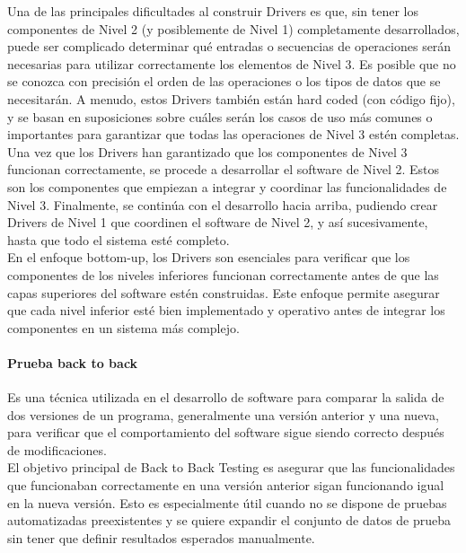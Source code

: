 Una de las principales dificultades al construir Drivers es que, sin tener los componentes de Nivel 2 (y posiblemente de Nivel 1) completamente desarrollados, puede ser complicado determinar qué entradas o secuencias de operaciones serán necesarias para utilizar correctamente los elementos de Nivel 3. Es posible que no se conozca con precisión el orden de las operaciones o los tipos de datos que se necesitarán. A menudo, estos Drivers también están hard coded (con código fijo), y se basan en suposiciones sobre cuáles serán los casos de uso más comunes o importantes para garantizar que todas las operaciones de Nivel 3 estén completas. \\

Una vez que los Drivers han garantizado que los componentes de Nivel 3 funcionan correctamente, se procede a desarrollar el software de Nivel 2. Estos son los componentes que empiezan a integrar y coordinar las funcionalidades de Nivel 3. Finalmente, se continúa con el desarrollo hacia arriba, pudiendo crear Drivers de Nivel 1 que coordinen el software de Nivel 2, y así sucesivamente, hasta que todo el sistema esté completo. \\

En el enfoque bottom-up, los Drivers son esenciales para verificar que los componentes de los niveles inferiores funcionan correctamente antes de que las capas superiores del software estén construidas. Este enfoque permite asegurar que cada nivel inferior esté bien implementado y operativo antes de integrar los componentes en un sistema más complejo.

\paragraph{Prueba back to back} Es una técnica utilizada en el desarrollo de software para comparar la salida de dos versiones de un programa, generalmente una versión anterior y una nueva, para verificar que el comportamiento del software sigue siendo correcto después de modificaciones. \\

El objetivo principal de Back to Back Testing es asegurar que las funcionalidades que funcionaban correctamente en una versión anterior sigan funcionando igual en la nueva versión. Esto es especialmente útil cuando no se dispone de pruebas automatizadas preexistentes y se quiere expandir el conjunto de datos de prueba sin tener que definir resultados esperados manualmente.

